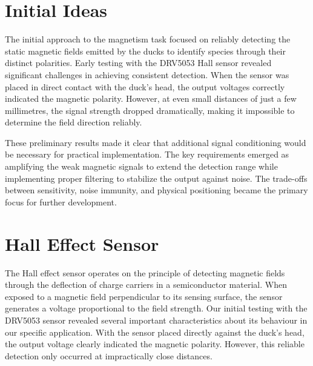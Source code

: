 \section{Initial Ideas}
The initial approach to the magnetism task focused on reliably detecting the static magnetic fields emitted by the ducks to identify species through their distinct polarities. Early testing with the DRV5053 Hall sensor revealed significant challenges in achieving consistent detection. When the sensor was placed in direct contact with the duck's head, the output voltages correctly indicated the magnetic polarity. However, at even small distances of just a few millimetres, the signal strength dropped dramatically, making it impossible to determine the field direction reliably.

These preliminary results made it clear that additional signal conditioning would be necessary for practical implementation. The key requirements emerged as amplifying the weak magnetic signals to extend the detection range while implementing proper filtering to stabilize the output against noise. The trade-offs between sensitivity, noise immunity, and physical positioning became the primary focus for further development.

\section{Hall Effect Sensor}
The Hall effect sensor operates on the principle of detecting magnetic fields through the deflection of charge carriers in a semiconductor material. When exposed to a magnetic field perpendicular to its sensing surface, the sensor generates a voltage proportional to the field strength. Our initial testing with the DRV5053 sensor revealed several important characteristics about its behaviour in our specific application. With the sensor placed directly against the duck's head, the output voltage clearly indicated the magnetic polarity. However, this reliable detection only occurred at impractically close distances.

